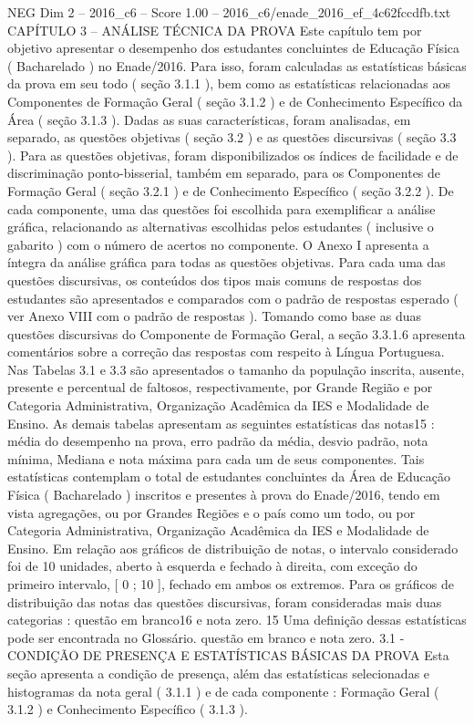 \begin{textsample}{NEG Dim 2 – 2016\_c6 – Score 1.00 – 2016\_c6/enade\_2016\_ef\_4c62fccdfb.txt}  \label{ex:f2_neg_227}
CAPÍTULO 3 – ANÁLISE TÉCNICA DA PROVA Este capítulo tem por objetivo apresentar o desempenho dos estudantes concluintes de Educação Física ( Bacharelado ) no Enade/2016.
Para isso, foram calculadas as estatísticas básicas da prova em seu todo ( seção 3.1.1 ), bem como as estatísticas relacionadas aos Componentes de Formação Geral ( seção 3.1.2 ) e de Conhecimento Específico da Área ( seção 3.1.3 ).
Dadas as suas características, foram analisadas, em separado, as questões objetivas ( seção 3.2 ) e as questões discursivas ( seção 3.3 ).
Para as questões objetivas, foram disponibilizados os índices de facilidade e de discriminação ponto-bisserial, também em separado, para os Componentes de Formação Geral ( seção 3.2.1 ) e de Conhecimento Específico ( seção 3.2.2 ).
De cada componente, uma das questões foi escolhida para exemplificar a análise gráfica, relacionando as alternativas escolhidas pelos estudantes ( inclusive o gabarito ) com o número de acertos no componente.
O Anexo I apresenta a íntegra da análise gráfica para todas as questões objetivas.
Para cada uma das questões discursivas, os conteúdos dos tipos mais comuns de respostas dos estudantes são apresentados e comparados com o padrão de respostas esperado ( ver Anexo VIII com o padrão de respostas ).
Tomando como base as duas questões discursivas do Componente de Formação Geral, a seção 3.3.1.6 apresenta comentários sobre a correção das respostas com respeito à Língua Portuguesa.
Nas Tabelas 3.1 e 3.3 são apresentados o tamanho da população inscrita, ausente, presente e percentual de faltosos, respectivamente, por Grande Região e por Categoria Administrativa, Organização Acadêmica da IES e Modalidade de Ensino.
As demais tabelas apresentam as seguintes estatísticas das notas15 : média do desempenho na prova, erro padrão da média, desvio padrão, nota mínima, Mediana e nota máxima para cada um de seus componentes.
Tais estatísticas contemplam o total de estudantes concluintes da Área de Educação Física ( Bacharelado ) inscritos e presentes à prova do Enade/2016, tendo em vista agregações, ou por Grandes Regiões e o país como um todo, ou por Categoria Administrativa, Organização Acadêmica da IES e Modalidade de Ensino.
Em relação aos gráficos de distribuição de notas, o intervalo considerado foi de 10 unidades, aberto à esquerda e fechado à direita, com exceção do primeiro intervalo, [ 0 ; 10 ], fechado em ambos os extremos.
Para os gráficos de distribuição das notas das questões discursivas, foram consideradas mais duas categorias : questão em branco16 e nota zero. 15 Uma definição dessas estatísticas pode ser encontrada no Glossário. questão em branco e nota zero. 3.1 - CONDIÇÃO DE PRESENÇA E ESTATÍSTICAS BÁSICAS DA PROVA Esta seção apresenta a condição de presença, além das estatísticas selecionadas e histogramas da nota geral ( 3.1.1 ) e de cada componente : Formação Geral ( 3.1.2 ) e Conhecimento Específico ( 3.1.3 ).

\end{textsample}
